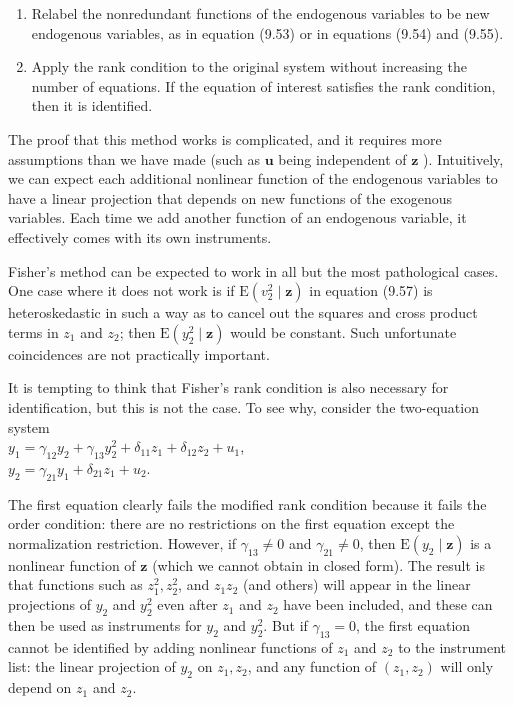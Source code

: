 \documentclass[10pt]{article}
\begin{document}
\begin{enumerate}
  \item Relabel the nonredundant functions of the endogenous variables to be new endogenous variables, as in equation (9.53) or in equations (9.54) and (9.55).
  \item Apply the rank condition to the original system without increasing the number of equations. If the equation of interest satisfies the rank condition, then it is identified.
\end{enumerate}

The proof that this method works is complicated, and it requires more assumptions than we have made (such as $\mathbf{u}$ being independent of $\mathbf{z}$ ). Intuitively, we can expect each additional nonlinear function of the endogenous variables to have a linear projection that depends on new functions of the exogenous variables. Each time we add another function of an endogenous variable, it effectively comes with its own instruments.

Fisher's method can be expected to work in all but the most pathological cases. One case where it does not work is if $\mathrm{E}\left(v_{2}^{2} \mid \mathbf{z}\right)$ in equation (9.57) is heteroskedastic in such a way as to cancel out the squares and cross product terms in $z_{1}$ and $z_{2}$; then $\mathrm{E}\left(y_{2}^{2} \mid \mathbf{z}\right)$ would be constant. Such unfortunate coincidences are not practically important.

It is tempting to think that Fisher's rank condition is also necessary for identification, but this is not the case. To see why, consider the two-equation system\\
$y_{1}=\gamma_{12} y_{2}+\gamma_{13} y_{2}^{2}+\delta_{11} z_{1}+\delta_{12} z_{2}+u_{1}$,\\
$y_{2}=\gamma_{21} y_{1}+\delta_{21} z_{1}+u_{2}$.

The first equation clearly fails the modified rank condition because it fails the order condition: there are no restrictions on the first equation except the normalization restriction. However, if $\gamma_{13} \neq 0$ and $\gamma_{21} \neq 0$, then $\mathrm{E}\left(y_{2} \mid \mathbf{z}\right)$ is a nonlinear function of $\mathbf{z}$ (which we cannot obtain in closed form). The result is that functions such as $z_{1}^{2}, z_{2}^{2}$, and $z_{1} z_{2}$ (and others) will appear in the linear projections of $y_{2}$ and $y_{2}^{2}$ even after $z_{1}$ and $z_{2}$ have been included, and these can then be used as instruments for $y_{2}$ and $y_{2}^{2}$. But if $\gamma_{13}=0$, the first equation cannot be identified by adding nonlinear functions of $z_{1}$ and $z_{2}$ to the instrument list: the linear projection of $y_{2}$ on $z_{1}, z_{2}$, and any function of $\left(z_{1}, z_{2}\right)$ will only depend on $z_{1}$ and $z_{2}$.
\end{document}
